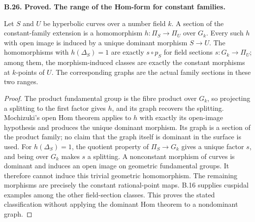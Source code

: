 \documentclass[11pt,oneside]{article}
\makeatletter
\newcounter{statementanchor}
\newenvironment{statement}[3]{%
 \refstepcounter{statementanchor}\def\@currentlabel{#1}%
 \par\addvspace{9pt}\noindent
 \textbf{#1. #2. #3.}\par\nobreak\noindent\ignorespaces
}{\par\addvspace{5pt}}
\makeatother
\begin{document}
\begin{statement}{B.26}{Proved}{The range of the Hom-form for constant families}
\label{st:B.26}

Let $S$ and $U$ be hyperbolic curves over a number field $k$.
A section of the constant-family extension is a homomorphism
$h:\Pi_S\to\Pi_U$ over $G_k$.  Every such $h$ with open image is
induced by a unique dominant morphism $S\to U$.
The homomorphisms with $h(\Delta_S)=1$ are exactly
$s\circ p_S$ for field sections $s:G_k\to\Pi_U$; among them, the
morphism-induced classes are exactly the constant morphisms at
$k$-points of $U$.  The corresponding graphs are the actual family
sections in these two ranges.
\end{statement}
\begin{proof}
The product fundamental group is the fibre product over $G_k$, so
projecting a splitting to the first factor gives $h$, and its graph
recovers the splitting.  Mochizuki's open Hom theorem applies to
$h$ with exactly its open-image hypothesis and produces the unique
dominant morphism.  Its graph is a section of the product family;
no claim that the graph itself is dominant in the surface is used.
For $h(\Delta_S)=1$, the quotient property of
$\Pi_S\to G_k$ gives a unique factor $s$, and being over $G_k$
makes $s$ a splitting.  A nonconstant morphism of curves is
dominant and induces an open image on geometric fundamental groups.
It therefore cannot induce this trivial geometric homomorphism.
The remaining morphisms are precisely the constant rational-point
maps.  B.16 supplies cuspidal examples among the other field-section
classes.  This proves the stated classification without applying
the dominant Hom theorem to a nondominant graph.
\end{proof}
\end{document}

